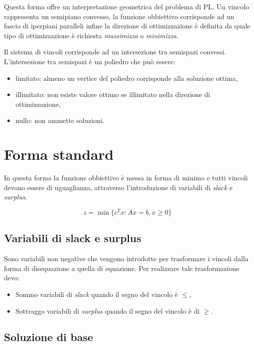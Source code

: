 Questa forma offre un interpretazione geometrica del problema di PL.
Un vincolo rappresenta un semipiano convesso, la funzione obbiettivo corrisponde ad un fascio di iperpiani paralleli infine la direzione di ottimizzazione è definita da quale tipo di ottimizzazione è richiesta \textit{massimizza} o \textit{minimizza}.

Il sistema di vincoli corrisponde ad un intersezione tra semispazi convessi. L'intersezione tra semispazi è un poliedro che può essere: 
\begin{itemize}
    \item limitato: almeno un vertice del poliedro corrisponde alla soluzione ottima,
    \item illimitato: non esiste valore ottimo se illimitato nella direzione di ottimizzazione,
    \item nullo: non ammette soluzioni.
\end{itemize}

\section{Forma standard}
In questa forma la funzione obbiettivo è messa in forma di minimo e tutti vincoli devono essere di uguaglianza, attraverso l'introduzione di variabili di \textit{slack} e \textit{surplus}.

\begin{equation} \label{formaStandard}
	z=\min \{c^Tx:Ax=b, x\geq0\}
\end{equation}

\subsection{Variabili di slack e surplus}
Sono variabili non negative che vengono introdotte per trasformare i vincoli dalla forma di disequazione a quella di equazione.
Per realizzare tale trasformazione devo:

\begin{itemize}
    \item Sommo variabili di \textit{slack} quando il segno del vincolo è $\leq$,
    \item Sottraggo variabili di \textit{surplus} quando il segno del vincolo è di $\geq$.
\end{itemize}

\subsection{Soluzione di base}

